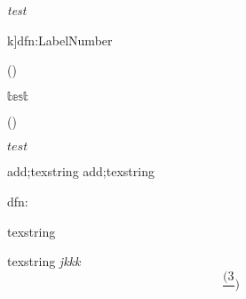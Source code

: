 \begin{itemize}
\end{itemize}

\textit{test}

\begin{dfn}k]{dfn:Label}{Number}
\end{dfn}

()

$\mathbb{test}$

()



\texorpdfstring{$test$}{word}

add;texstring
add;texstring




\begin{dfn}[jk]{dfn:}{}
	
\end{dfn}


texstring

texstring
\textit{jkkk}
\[\frac{(3}{})\]

